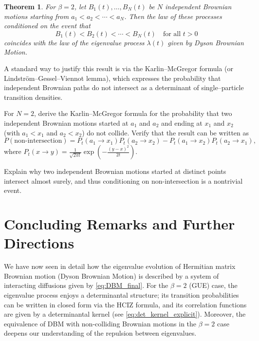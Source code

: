 \documentclass[letterpaper,11pt,oneside,reqno]{article}
\numberwithin{equation}{section}
\newtheorem{theorem}[proposition]{Theorem}
\theoremstyle{definition}
\begin{document}
\begin{theorem}
For \(\beta=2\), let \(B_1(t), \dots, B_N(t)\) be \(N\) independent Brownian motions starting from \(a_1< a_2< \cdots < a_N\). Then the law of these processes conditioned on the event that
\[
B_1(t) < B_2(t) < \cdots < B_N(t) \quad \text{for all } t>0
\]
coincides with the law of the eigenvalue process \(\lambda(t)\) given by Dyson Brownian Motion.
\end{theorem}

A standard way to justify this result is via the Karlin–McGregor formula (or Lindström–Gessel–Viennot lemma), which expresses the probability that independent Brownian paths do not intersect as a determinant of single–particle transition densities.

\begin{exercise}
For \(N=2\), derive the Karlin–McGregor formula for the probability that two independent Brownian motions started at \(a_1\) and \(a_2\) and ending at \(x_1\) and \(x_2\) (with \(a_1<x_1\) and \(a_2<x_2\)) do not collide. Verify that the result can be written as
\[
P(\text{non-intersection}) = P_t(a_1\to x_1)P_t(a_2\to x_2)-P_t(a_1\to x_2)P_t(a_2\to x_1),
\]
where \(P_t(x\to y)=\frac{1}{\sqrt{2\pi t}}\exp\left(-\frac{(y-x)^2}{2t}\right)\).
\end{exercise}

\begin{exercise}
Explain why two independent Brownian motions started at distinct points intersect almost surely, and thus conditioning on non-intersection is a nontrivial event.
\end{exercise}

\section{Concluding Remarks and Further Directions}

We have now seen in detail how the eigenvalue evolution of Hermitian matrix Brownian motion (Dyson Brownian Motion) is described by a system of interacting diffusions given by \eqref{eq:DBM_final}. For the \(\beta=2\) (GUE) case, the eigenvalue process enjoys a determinantal structure; its transition probabilities can be written in closed form via the HCIZ formula, and its correlation functions are given by a determinantal kernel (see \eqref{eq:det_kernel_explicit}). Moreover, the equivalence of DBM with non-colliding Brownian motions in the \(\beta=2\) case deepens our understanding of the repulsion between eigenvalues.
\end{document}
